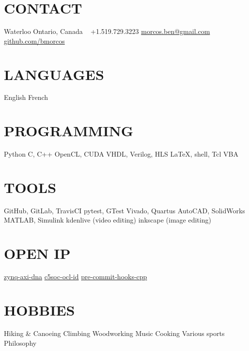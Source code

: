 \documentclass[a4paper,nocolors]{cv-friggeri-ben}
\begin{document}


\begin{aside} %
    \section{CONTACT}
    \hfill Waterloo
    \hfill Ontario, Canada
    ~
    \hfill +1.519.729.3223
    \hfill \href{mailto:morcos.ben@gmail.com}{morcos.ben@gmail.com}
    ~
    \hfill \href{https://github.com/bmorcos}{github.com/bmorcos}
    \section{LANGUAGES}
    English
    French
    \section{PROGRAMMING}
    Python
    C, C++
    OpenCL, CUDA
    VHDL, Verilog, HLS
    \LaTeX, shell, Tcl
    VBA
    \section{TOOLS}
    GitHub, GitLab, TravisCI
    pytest, GTest
    Vivado, Quartus
    AutoCAD, SolidWorks
    MATLAB, Simulink
    kdenlive (video editing)
    inkscape (image editing)
    \section{OPEN IP}
    \href{https://github.com/abr/zynq-axi-dna}{zynq-axi-dna}
    \href{https://github.com/abr/c5soc-ocl-id}{c5soc-ocl-id}
    \href{https://github.com/bmorcos/pre-commit-hooks-cpp}{pre-commit-hooks-cpp}
    \section{HOBBIES}
    Hiking \& Canoeing
    Climbing
    Woodworking
    Music
    Cooking
    Various sports
    Philosophy
\end{aside}
\end{document}
